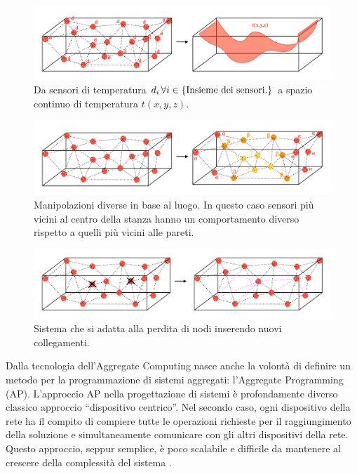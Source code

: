 \documentclass[12pt,a4paper,openright,twoside]{book}
\begin{document}
\begin{figure}
    \centering
    \includegraphics[width=.9\linewidth]{figures/points-to-gradient.pdf}
    \caption{Da sensori di temperatura $d_i \thinspace \forall i \in {\text{\{Insieme dei sensori.\}}}$ a spazio continuo di temperatura $t(x,y,z)$.}
    \label{fig:points-to-linear}
\end{figure}

\begin{figure}
    \centering
    \includegraphics[width=.9\linewidth]{figures/different-function.pdf}
    \caption{Manipolazioni diverse in base al luogo. In questo caso sensori più vicini al centro della stanza hanno un comportamento diverso rispetto a quelli più vicini alle pareti.}
    \label{fig:different-function}
\end{figure}

\begin{figure}
    \centering
    \includegraphics[width=.9\linewidth]{figures/lost-nodes.pdf}
    \caption{Sistema che si adatta alla perdita di nodi inserendo nuovi collegamenti.}
    \label{fig:lost-nodes}
\end{figure}

Dalla tecnologia dell'Aggregate Computing nasce anche la volontà di definire un metodo per la programmazione di sistemi aggregati: l'Aggregate Programming (AP). 
L'approccio \ac{AP} nella progettazione di sistemi è profondamente diverso classico approccio ``dispositivo centrico''.
Nel secondo caso, ogni dispositivo della rete ha il compito di compiere tutte le operazioni richieste per il raggiungimento della soluzione e simultaneamente comunicare con gli altri dispositivi della rete. Questo approccio, seppur semplice, è poco scalabile e difficile da mantenere al crescere della complessità del sistema \cite{Pianini2017}. 
\end{document}
